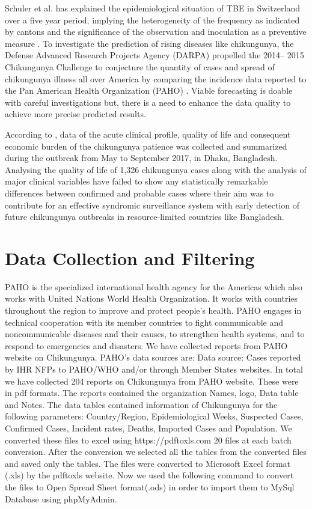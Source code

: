 \documentclass[conference]{IEEEtran}
\begin{document}
Schuler et al. has explained the epidemiological situation of TBE in Switzerland over a five year period, implying the heterogeneity of the frequency as indicated by cantons and the significance of the observation and inoculation as a preventive measure \cite{four}. To investigate the prediction of rising diseases like chikungunya, the Defense Advanced Research Projects Agency (DARPA) propelled the 2014– 2015  Chikungunya Challenge to conjecture the quantity of cases and spread of chikungunya illness all over America by comparing the incidence data reported to the Pan American Health Organization (PAHO) \cite{five}. Viable forecasting is doable with careful investigations but, there is a need to enhance the data quality to achieve more precise predicted results.

According to \cite{six}, data of the acute clinical profile, quality of life and consequent economic burden of the chikungunya patience was collected and summarized during the outbreak from May to September 2017, in Dhaka, Bangladesh. Analysing the quality of life of 1,326 chikungunya cases along with the analysis of major clinical variables have failed to show any statistically remarkable differences between confirmed and probable cases where their aim was to contribute for an effective syndromic surveillance system with early detection of future chikungunya outbreaks in resource-limited countries like Bangladesh.


\thispagestyle{empty}
\section{Data Collection and Filtering}

PAHO is the specialized international health agency for the Americas which also works with United Nations World Health Organization.
It works with countries throughout the region to improve and protect people's health. PAHO engages in technical cooperation with its member countries to fight communicable and noncommunicable diseases and their causes, to strengthen health systems, and to respond to emergencies and disasters.
We have collected reports from PAHO website on Chikungunya. PAHO’s data sources are: Data source: Cases reported by IHR NFPs to PAHO/WHO and/or through Member States websites.
In total we have collected 204 reports on Chikungunya from PAHO website. These were in pdf formats.
The reports contained the organization Names, logo, Data table and Notes. The data tables contained information of Chikungunya for the following parameters: Country/Region, Epidemiological Weeks, Suspected Cases, Confirmed Cases, Incident rates, Deaths, Imported Cases and Population.
 We converted these files to excel using https://pdftoxls.com 20 files at each batch conversion. After the conversion we selected all the tables from the converted files and saved only the tables. The files were converted to Microsoft Excel format (.xls) by the pdftoxls website.  Now we used the following command to convert the files to Open Spread Sheet format(.ods) in  order to import them to MySql Database using phpMyAdmin.
\end{document}
